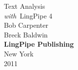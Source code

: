 \cleardoublepage
\pagestyle{empty}
\vspace*{1in}
\begin{center}
{\hfill \fontsize{45}{65}\selectfont Text Analysis \\[18pt] \hfill {\fontsize{30}{45}\it with}\  LingPipe 4}
\\[1in]
{\hfill\Huge Bob Carpenter}
\\[12pt]
{\hfill\Huge Breck Baldwin}
\\[-1pt]
\vfill
{\hfill \large\bf LingPipe Publishing}
\\[1pt]
{\hfill \small New York}
\\[-1pt]
{\hfill \small 2011}
\end{center}
